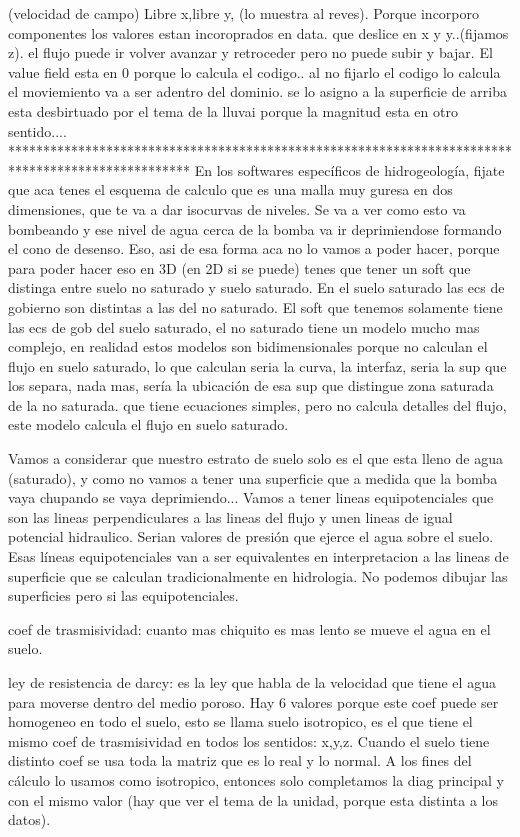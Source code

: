 \documentclass[10pt,a4paper,final]{article}
\begin{document}
(velocidad de campo) Libre x,libre y,  (lo muestra al reves). Porque incorporo componentes los valores estan incoroprados en data.
que deslice en x y y..(fijamos z).
el flujo puede ir volver avanzar y retroceder pero no puede subir y bajar. El value field esta en 0 porque lo calcula el codigo.. al no fijarlo el codigo lo calcula
el moviemiento va a ser adentro del dominio. se lo asigno  a la superficie de arriba
esta desbirtuado por el tema de la lluvai porque la magnitud esta en otro sentido....
**************************************************************************************************
En los softwares específicos de hidrogeología, fijate que aca tenes el esquema de calculo que es una malla muy guresa en dos dimensiones, que te va a dar isocurvas de niveles. Se va a ver como esto va bombeando y ese nivel de agua cerca de la bomba va ir deprimiendose formando el cono de desenso. Eso, asi de esa forma aca no lo vamos a poder hacer, porque para poder hacer eso en 3D (en 2D si se puede) tenes que tener un soft que distinga entre suelo no saturado y suelo saturado. En el suelo saturado las ecs de gobierno son distintas a las del no saturado. El soft que tenemos solamente tiene las ecs de gob del suelo saturado, el no saturado tiene un modelo mucho mas complejo, en realidad estos modelos son bidimensionales porque no calculan el flujo en suelo saturado, lo que calculan seria la curva, la interfaz, seria la sup que los separa, nada mas, sería la ubicación de esa sup que distingue zona saturada de la no saturada. que tiene ecuaciones simples, pero no calcula detalles del flujo, este modelo calcula el flujo en suelo saturado. 

Vamos a considerar que nuestro estrato de suelo solo es el que esta lleno de agua (saturado), y como no vamos a tener una superficie que a medida que la bomba vaya chupando se vaya deprimiendo... Vamos a tener lineas equipotenciales que son las lineas perpendiculares a las lineas del flujo y unen lineas de igual potencial hidraulico. Serian valores de presión que ejerce el agua sobre el suelo. Esas líneas equipotenciales van a ser equivalentes en interpretacion a las lineas de superficie que se calculan tradicionalmente en hidrologia. No podemos dibujar las superficies pero si las equipotenciales.

coef de trasmisividad: cuanto mas chiquito es mas lento se mueve el agua en el suelo.

ley de resistencia de darcy: es la ley que habla de la velocidad que tiene el agua para moverse dentro del medio poroso. Hay 6 valores porque este coef puede ser homogeneo en todo el suelo, esto se llama suelo isotropico, es el que tiene el mismo coef de trasmisividad en todos los sentidos: x,y,z. Cuando el suelo tiene distinto coef se usa toda la matriz que es lo real y lo normal. A los fines del cálculo lo usamos como isotropico, entonces solo completamos la diag principal y con el mismo valor (hay que ver el tema de la unidad, porque esta distinta a los datos). 
\end{document}

